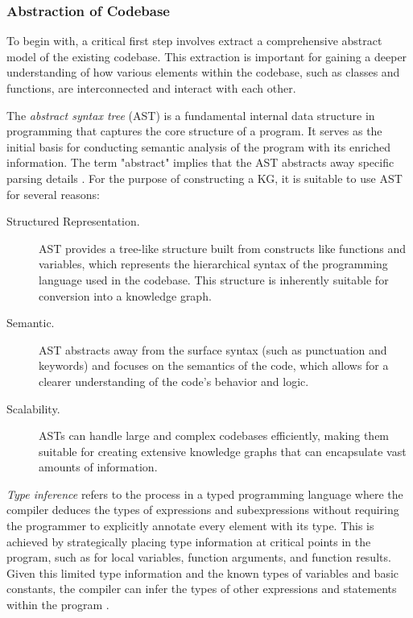 \subsubsection{Abstraction of Codebase} 
To begin with, a critical first step involves extract a comprehensive abstract model of the existing codebase. This extraction is important for gaining a deeper understanding of how various elements within the codebase, such as classes and functions, are interconnected and interact with each other. 


The \textit{abstract syntax tree} (AST) is a fundamental internal data structure in programming that captures the core structure of a program. It serves as the initial basis for conducting semantic analysis of the program with its enriched information. The term "abstract" implies that the AST abstracts away specific parsing details \cite{Thain_2021}. For the purpose of constructing a KG, it is suitable to use AST for several reasons:  

\begin{description}
  \item[Structured Representation.] AST provides a tree-like structure built from constructs like functions and variables, which represents the hierarchical syntax of the programming language used in the codebase. This structure is inherently suitable for conversion into a knowledge graph.
  \item[Semantic.] AST abstracts away from the surface syntax (such as punctuation and keywords) and focuses on the semantics of the code, which allows for a clearer understanding of the code's behavior and logic.
  \item[Scalability.] ASTs can handle large and complex codebases efficiently, making them suitable for creating extensive knowledge graphs that can encapsulate vast amounts of information.
\end{description}


\textit{Type inference} refers to the process in a typed programming language where the compiler deduces the types of expressions and subexpressions without requiring the programmer to explicitly annotate every element with its type. This is achieved by strategically placing type information at critical points in the program, such as for local variables, function arguments, and function results. Given this limited type information and the known types of variables and basic constants, the compiler can infer the types of other expressions and statements within the program  \cite{Cardelli_1985}. 

